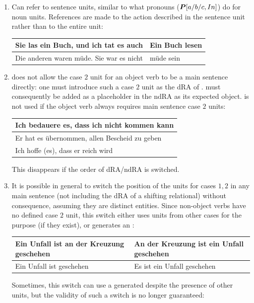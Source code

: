 \begin{enumerate}
\item Can refer to  sentence units, similar to what pronouns ($\boldsymbol{P}[a/b/c,In]$) do for noun units. References are  made to the action described in the sentence unit rather than to the entire unit:\begin{example}\begin{tabular}{m{9cm}|m{5cm}}
    Sie las ein Buch, und ich tat es auch & Ein Buch lesen\\\hline
    Die anderen waren müde. Sie war es nicht & müde sein \end{tabular}\end{example}
\item {} does not allow the case $2$ unit for an object verb to be a main sentence directly: one must  introduce such a case $2$ unit as the dRA of .  must consequently be added as a placeholder in the ndRA as its expected object.  is not used if the object verb always requires main sentence case $2$ units: \begin{example}\begin{tabular}{m{14cm}}
        Ich bedauere es, dass ich nicht kommen kann\\\hline Er hat es übernommen, allen Bescheid zu geben \\\hline Ich hoffe (es), dass er reich wird \end{tabular}\end{example}
    This  disappears if the order of dRA/ndRA is switched.
\item It is possible in general to switch the position of the units for cases $1,2$ in any main sentence (not including the dRA of a shifting relational) without consequence, assuming they are distinct entities. Since non-object verbs have no defined case $2$ unit, this switch either uses units from other cases for the purpose (if they exist), or generates an :\begin{example}\begin{tabular}{m{7cm}|m{7cm}}
    Ein Unfall ist an der Kreuzung geschehen & An der Kreuzung ist ein Unfall geschehen\\\hline
    Ein Unfall ist geschehen & Es ist ein Unfall geschehen \end{tabular}\end{example}
    Sometimes, this switch can use a generated  despite the presence of other units, but the validity of such a switch is no longer guaranteed:\begin{example}

\end{example}
\end{enumerate}
